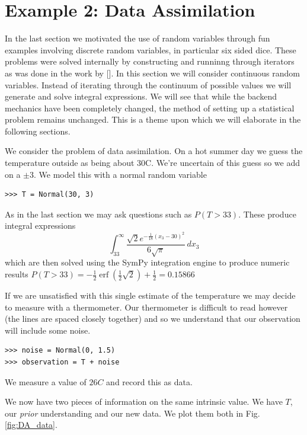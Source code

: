 \section{Example 2: Data Assimilation}

In the last section we motivated the use of random variables through fun examples involving discrete random variables, in particular six sided dice. These problems were solved internally by constructing and runninng through iterators as was done in the work by []. In this section we will consider continuous random variables. Instead of iterating through the continuum of possible values we will generate and solve integral expressions. We will see that while the
backend mechanics have been completely changed, the method of setting up a statistical problem remains unchanged. This is a theme upon which we will elaborate in the following sections. 

We consider the problem of data assimilation. On a hot summer day we guess the temperature outside as being about 30C. We're uncertain of this guess so we add on a $\pm3$. We model this with a normal random variable

\begin{lstlisting}
>>> T = Normal(30, 3)
\end{lstlisting}

As in the last section we may ask questions such as $P(T>33)$. These produce integral expressions 
$$\int_{33}^{\infty} \frac{\sqrt{2} e^{- \frac{1}{18} \left(x_{3} -30\right)^{2}}}{6 \sqrt{\pi}}\, dx_{3}$$
which are then solved using the SymPy integration engine to produce numeric results $P(T>33) = - \frac{1}{2} \operatorname{erf}{\left (\frac{1}{2} \sqrt{2} \right )} + \frac{1}{2} = 0.15866$

If we are unsatisfied with this single estimate of the temperature we may decide to measure with a thermometer. Our thermometer is difficult to read however (the lines are spaced closely together) and so we understand that our observation will include some noise. 

\begin{lstlisting}
>>> noise = Normal(0, 1.5)
>>> observation = T + noise
\end{lstlisting}

We measure a value of $26C$ and record this as data.

We now have two pieces of information on the same intrinsic value. We have $T$, our \textit{prior} understanding and our new data. We plot them both in Fig. \ref{fig:DA_data}. 

